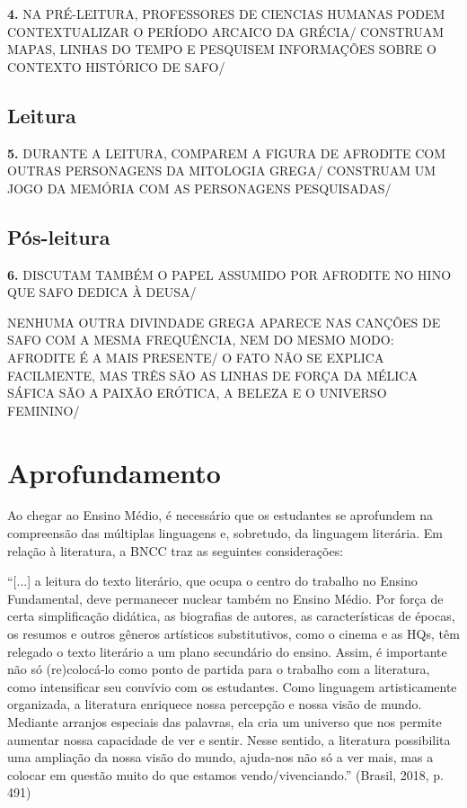 \documentclass[12pt]{extarticle}
\begin{document}
\textbf{4.} NA PRÉ-LEITURA, PROFESSORES DE CIENCIAS HUMANAS PODEM
CONTEXTUALIZAR O PERÍODO ARCAICO DA GRÉCIA/ CONSTRUAM MAPAS, LINHAS DO
TEMPO E PESQUISEM INFORMAÇÕES SOBRE O CONTEXTO HISTÓRICO DE SAFO/


\subsection{Leitura}



\textbf{5.} DURANTE A LEITURA, COMPAREM A FIGURA DE AFRODITE COM OUTRAS
PERSONAGENS DA MITOLOGIA GREGA/ CONSTRUAM UM JOGO DA MEMÓRIA COM AS
PERSONAGENS PESQUISADAS/


\subsection{Pós-leitura}

\textbf{6.} DISCUTAM TAMBÉM O PAPEL ASSUMIDO POR AFRODITE NO HINO QUE
SAFO DEDICA À DEUSA/


NENHUMA OUTRA DIVINDADE GREGA APARECE NAS CANÇÕES DE SAFO COM A MESMA
FREQUÊNCIA, NEM DO MESMO MODO: AFRODITE É A MAIS PRESENTE/ O FATO NÃO SE
EXPLICA FACILMENTE, MAS TRÊS SÃO AS LINHAS DE FORÇA DA MÉLICA SÁFICA
SÃO A PAIXÃO ERÓTICA, A BELEZA E O UNIVERSO FEMININO/

\section{Aprofundamento}


Ao chegar ao Ensino Médio, é necessário que os estudantes se aprofundem
na compreensão das múltiplas linguagens e, sobretudo, da linguagem
literária. Em relação à literatura, a BNCC traz as seguintes
considerações:

``{[}...{]} a leitura do texto literário, que ocupa o centro do trabalho
no Ensino Fundamental, deve permanecer nuclear também no Ensino Médio.
Por força de certa simplificação didática, as biografias de autores, as
características de épocas, os resumos e outros gêneros artísticos
substitutivos, como o cinema e as HQs, têm relegado o texto literário a
um plano secundário do ensino. Assim, é importante não só (re)colocá-lo
como ponto de partida para o trabalho com a literatura, como
intensificar seu convívio com os estudantes. Como linguagem
artisticamente organizada, a literatura enriquece nossa percepção e
nossa visão de mundo. Mediante arranjos especiais das palavras, ela cria
um universo que nos permite aumentar nossa capacidade de ver e sentir.
Nesse sentido, a literatura possibilita uma ampliação da nossa visão do
mundo, ajuda-nos não só a ver mais, mas a colocar em questão muito do
que estamos vendo/vivenciando.'' (Brasil, 2018, p. 491)
\end{document}
